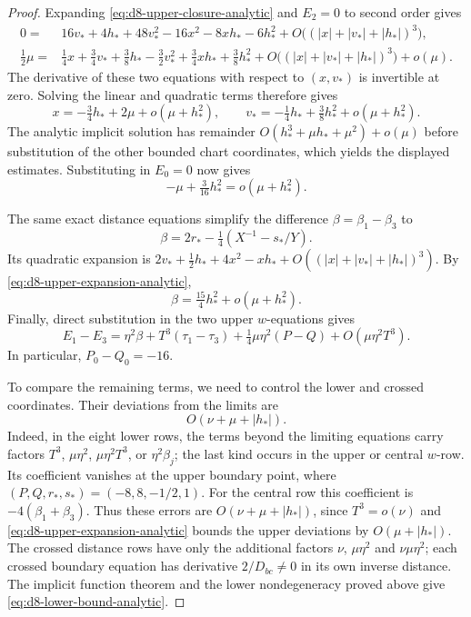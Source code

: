 \documentclass[Threeside,11pt]{article}
\theoremstyle{definition}
\theoremstyle{remark}
\numberwithin{equation}{section}
\theoremstyle{remark}
\begin{document}
{\begin{proof}
Expanding \eqref{eq:d8-upper-closure-analytic} and $E_2=0$ to second order gives
\begin{align*}
0={}&16v_*+4h_*+48v_*^2-16x^2-8xh_*-6h_*^2
 +O\bigl((|x|+|v_*|+|h_*|)^3\bigr),\\
\tfrac12\mu={}&\tfrac14x+\tfrac34v_*+\tfrac38h_*
 -\tfrac32v_*^2+\tfrac34xh_*+\tfrac38h_*^2
 +O\bigl((|x|+|v_*|+|h_*|)^3\bigr)+o(\mu).
\end{align*}
The derivative of these two equations with respect to $(x,v_*)$ is invertible
at zero. Solving the linear and quadratic terms therefore gives
\begin{equation}\label{eq:d8-upper-expansion-analytic}
x=-\tfrac34h_*+2\mu+o(\mu+h_*^2),\qquad
v_*=-\tfrac14h_*+\tfrac38h_*^2+o(\mu+h_*^2).
\end{equation}
The analytic implicit solution has remainder
$O(h_*^3+\mu h_*+\mu^2)+o(\mu)$ before substitution of the other
bounded chart coordinates, which yields the displayed estimates.
Substituting in $E_0=0$ now gives
\begin{equation}\label{eq:d8-row0-analytic}
-\mu+\tfrac3{16}h_*^2=o(\mu+h_*^2).
\end{equation}

The same exact distance equations simplify the difference
$\beta=\beta_1-\beta_3$ to
\[
\beta=2r_*-\tfrac14(X^{-1}-s_*/Y).
\]
Its quadratic expansion is
$2v_*+\tfrac12h_*+4x^2-xh_*+O((|x|+|v_*|+|h_*|)^3)$.
By \eqref{eq:d8-upper-expansion-analytic},
\begin{equation}\label{eq:d8-beta-analytic}
\beta=\tfrac{15}{4}h_*^2+o(\mu+h_*^2).
\end{equation}
Finally, direct substitution in the two upper $w$-equations gives
\begin{equation}\label{eq:d8-w-difference-analytic}
E_1-E_3=\eta^2\beta+T^3(\tau_1-\tau_3)
 +\tfrac14\mu\eta^2(P-Q)+O(\mu\eta^2T^3).
\end{equation}
In particular, $P_0-Q_0=-16$.

To compare the remaining terms, we need to control the lower and crossed
coordinates.  Their deviations from the limits are
\begin{equation}\label{eq:d8-lower-bound-analytic}
O(\nu+\mu+|h_*|).
\end{equation}
Indeed, in the eight lower rows, the terms beyond the limiting equations carry
factors $T^3$, $\mu\eta^2$, $\mu\eta^2T^3$, or $\eta^2\beta_j$;
the last kind occurs in the upper or central $w$-row. Its coefficient
vanishes at the upper boundary point, where $(P,Q,r_*,s_*)=(-8,8,-1/2,1)$.
For the central row this coefficient is $-4(\beta_1+\beta_3)$.
Thus these errors are $O(\nu+\mu+|h_*|)$, since $T^3=o(\nu)$ and
\eqref{eq:d8-upper-expansion-analytic} bounds the upper deviations by
$O(\mu+|h_*|)$. The crossed distance rows have only the additional factors
$\nu$, $\mu\eta^2$ and $\nu\mu\eta^2$; each crossed boundary equation has derivative
$2/D_{bc}\ne0$ in its own inverse distance. The implicit function theorem
and the lower nondegeneracy proved above give
\eqref{eq:d8-lower-bound-analytic}.


\end{proof}}
\end{document}
